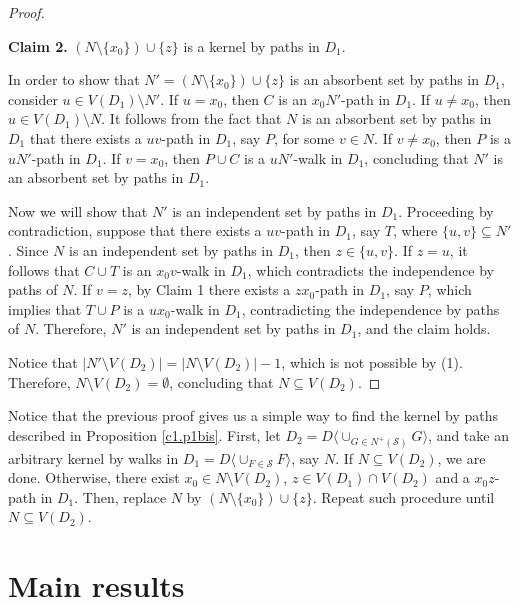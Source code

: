 \documentclass[10pt,a4paper]{article}
\begin{document}
\begin{proof}
\begin{description}
	\item \textbf{Claim 2.} $(N \setminus \{ x_{0}\}) \cup \{ z \}$ is a kernel by paths in $D_{1}$. 

In order to show that $N'=(N \setminus \{ x_{0}\}) \cup \{ z \}$ is an absorbent set by paths in $D_{1}$, consider $u \in V(D_{1}) \setminus N'$. 
If $u=x_{0}$, then $C$ is an $x_{0}N'$-path in $D_{1}$. 
If $u \neq x_{0}$, then $u \in V(D_{1}) \setminus N$. It follows from the fact that $N$ is an absorbent set by paths in $D_{1}$ that there exists a $uv$-path in $D_{1}$, say $P$, for some $v \in N$. If $v \neq x_{0}$, then $P$ is a $uN'$-path in $D_{1}$. If $v=x_{0}$, then $P \cup C$ is a $uN'$-walk in $D_{1}$, concluding that $N'$ is an absorbent set by paths in $D_{1}$.

Now we will show that $N'$ is an independent set by paths in $D_{1}$. Proceeding by contradiction, suppose that there exists a $uv$-path in $D_{1}$, say $T$, where $\{ u, v \} \subseteq N'$. 
Since $N$ is an independent set by paths in $D_{1}$, then $z \in \{ u, v \}$. 
If $z=u$, it follows that  $C \cup T$ is an $x_{0}v$-walk in $D_{1}$, which contradicts the independence by paths of $N$. If $v=z$, by Claim 1 there exists a $zx_{0}$-path in $D_{1}$, say $P$, which implies that $T \cup P$ is a $ux_{0}$-walk in $D_{1}$, contradicting the independence by paths of $N$. Therefore, $N'$ is an independent set by paths in $D_{1}$, and the claim holds.
\end{description}

Notice that $| N' \setminus V(D_{2})| = | N \setminus V(D_{2})|-1$, which is not possible by (1). Therefore, $N \setminus V(D_{2})=\emptyset$, concluding that $N \subseteq  V(D_{2})$. 
\end{proof}

Notice that the previous proof gives us a simple way to find the kernel by paths described in Proposition \ref{c1.p1bis}. First, let $D_{2} = D\langle \cup_{G \in  N^{+}(\mathcal{S})} G \rangle$, and take an arbitrary kernel by walks in $D_{1}= D\langle \cup_{F \in \mathcal{S}} F\rangle$, say $N$. If $N \subseteq V(D_{2})$, we are done. Otherwise, there exist $x_{0} \in N \setminus V(D_{2})$, $z \in V(D_{1}) \cap V(D_{2})$ and a $x_{0}z$-path in $D_{1}$. Then, replace $N$ by $(N \setminus \{ x_{0} \}) \cup \{z\}$. Repeat such procedure until $N \subseteq V(D_{2})$.

\section{Main results} 
\end{document}
